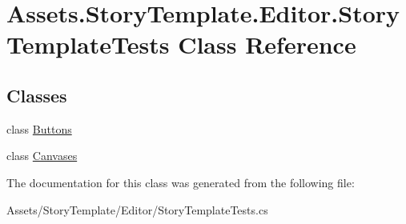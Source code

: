 \hypertarget{classAssets_1_1StoryTemplate_1_1Editor_1_1StoryTemplateTests}{}\section{Assets.\+Story\+Template.\+Editor.\+Story\+Template\+Tests Class Reference}
\label{classAssets_1_1StoryTemplate_1_1Editor_1_1StoryTemplateTests}
\subsection*{Classes}
\begin{DoxyCompactItemize}
\item 
class \hyperlink{classAssets_1_1StoryTemplate_1_1Editor_1_1StoryTemplateTests_1_1Buttons}{Buttons}
\item 
class \hyperlink{classAssets_1_1StoryTemplate_1_1Editor_1_1StoryTemplateTests_1_1Canvases}{Canvases}
\end{DoxyCompactItemize}


The documentation for this class was generated from the following file\+:\begin{DoxyCompactItemize}
\item 
Assets/\+Story\+Template/\+Editor/Story\+Template\+Tests.\+cs\end{DoxyCompactItemize}
